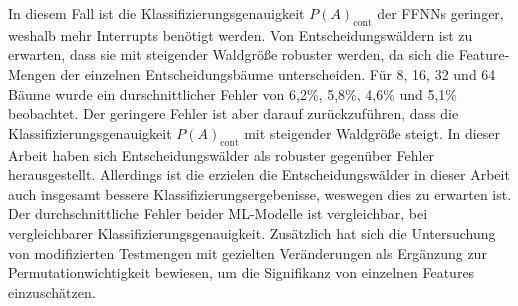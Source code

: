 In diesem Fall ist die Klassifizierungsgenauigkeit $P(A)_{\text{cont}}$ der FFNNs geringer, weshalb mehr Interrupts benötigt werden.
\newline
\newline
Von Entscheidungswäldern ist zu erwarten, dass sie mit steigender Waldgröße robuster werden, da sich die Feature-Mengen der einzelnen Entscheidungsbäume unterscheiden.
Für 8, 16, 32 und 64 Bäume wurde ein durschnittlicher Fehler von 6,2\%, 5,8\%, 4,6\% und 5,1\% beobachtet.
Der geringere Fehler ist aber darauf zurückzuführen, dass die Klassifizierungsgenauigkeit $P(A)_{\text{cont}}$ mit steigender Waldgröße steigt.
\newpage
In dieser Arbeit haben sich Entscheidungswälder als robuster gegenüber Fehler herausgestellt.
Allerdings ist die erzielen die Entscheidungswälder in dieser Arbeit auch insgesamt bessere Klassifizierungsergebenisse, weswegen dies zu erwarten ist.
Der durchschnittliche Fehler beider ML-Modelle ist vergleichbar, bei vergleichbarer Klassifizierungsgenauigkeit.
Zusätzlich hat sich die Untersuchung von modifizierten Testmengen mit gezielten Veränderungen als Ergänzung zur Permutationwichtigkeit bewiesen,
um die Signifikanz von einzelnen Features einzuschätzen.